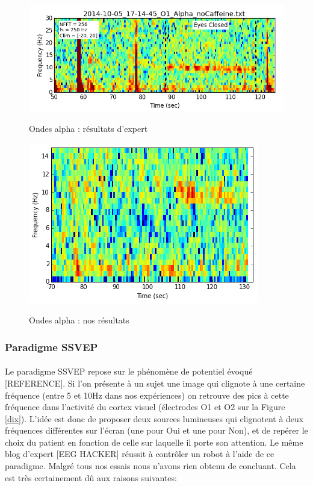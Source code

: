 \documentclass[11pt,a4paper]{article}
\theoremstyle{plain}
\theoremstyle{definition}
\begin{document}
\begin{figure}[h!]
\centering
\caption{Ondes alpha : résultats d'expert}
\includegraphics[scale=0.5]{images/eeghackerAlpha.png}
\label{eeghack}%
\end{figure}
\begin{figure}[h!]
\centering
\caption{Ondes alpha : nos résultats}
\includegraphics[scale=0.5]{images/ourAlpha.png}
\label{ouralph}%
\end{figure}

\subsubsection{Paradigme SSVEP}

\paragraph{} Le paradigme SSVEP repose sur le phénomène de potentiel évoqué [REFERENCE]. Si l'on présente à un sujet une image qui clignote à une certaine fréquence (entre 5 et 10Hz dans nos expériences) on retrouve 
des pics à cette fréquence dans l'activité du cortex visuel (électrodes O1 et O2 sur la Figure \ref{dix}). L'idée est donc de proposer deux sources lumineuses qui clignotent à deux fréquences différentes sur l'écran (une pour Oui et une pour Non), et de repérer le choix du patient en fonction de celle sur laquelle il porte son attention. Le même blog d'expert [EEG HACKER] réussit à contrôler un robot à l'aide de ce paradigme.
Malgré tous nos essais nous n'avons rien obtenu de concluant. Cela est très certainement dû aux raisons suivantes:
\end{document}
